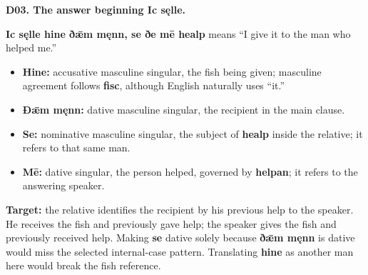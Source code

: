 \par\begin{minipage}{\linewidth}\raggedright
\textbf{D03. The answer beginning Ic sęlle.}

\textbf{Ic sęlle hine ðǣm męnn, se ðe mē healp} means “I give it to the man who helped me.”

\begin{itemize}
\item \textbf{Hine:} accusative masculine singular, the fish being given; masculine agreement follows \textbf{fisc}, although English naturally uses “it.”
\item \textbf{Ðǣm męnn:} dative masculine singular, the recipient in the main clause.
\item \textbf{Se:} nominative masculine singular, the subject of \textbf{healp} inside the relative; it refers to that same man.
\item \textbf{Mē:} dative singular, the person helped, governed by \textbf{helpan}; it refers to the answering speaker.
\end{itemize}

\textbf{Target:} the relative identifies the recipient by his previous help to the speaker. He receives the fish and previously gave help; the speaker gives the fish and previously received help. Making \textbf{se} dative solely because \textbf{ðǣm męnn} is dative would miss the selected internal-case pattern. Translating \textbf{hine} as another man here would break the fish reference.

\end{minipage}\par\addvspace{4pt}

